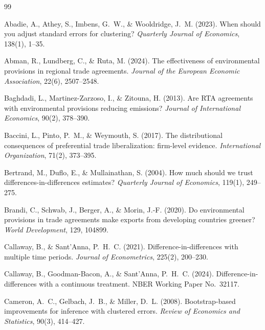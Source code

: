 \documentclass[12pt]{article}
\begin{document}
\begin{thebibliography}{99}

Abadie, A., Athey, S., Imbens, G.~W., \& Wooldridge, J.~M. (2023).
When should you adjust standard errors for clustering?
\emph{Quarterly Journal of Economics}, 138(1), 1--35.

Abman, R., Lundberg, C., \& Ruta, M. (2024).
The effectiveness of environmental provisions in regional trade agreements.
\emph{Journal of the European Economic Association}, 22(6), 2507--2548.

Baghdadi, L., Martinez-Zarzoso, I., \& Zitouna, H. (2013).
Are RTA agreements with environmental provisions reducing emissions?
\emph{Journal of International Economics}, 90(2), 378--390.

Baccini, L., Pinto, P.~M., \& Weymouth, S. (2017).
The distributional consequences of preferential trade liberalization: firm-level evidence.
\emph{International Organization}, 71(2), 373--395.

Bertrand, M., Duflo, E., \& Mullainathan, S. (2004).
How much should we trust differences-in-differences estimates?
\emph{Quarterly Journal of Economics}, 119(1), 249--275.

Brandi, C., Schwab, J., Berger, A., \& Morin, J.-F. (2020).
Do environmental provisions in trade agreements make exports from developing countries greener?
\emph{World Development}, 129, 104899.

Callaway, B., \& Sant'Anna, P.~H.~C. (2021).
Difference-in-differences with multiple time periods.
\emph{Journal of Econometrics}, 225(2), 200--230.

Callaway, B., Goodman-Bacon, A., \& Sant'Anna, P.~H.~C. (2024).
Difference-in-differences with a continuous treatment.
NBER Working Paper No.\ 32117.

Cameron, A.~C., Gelbach, J.~B., \& Miller, D.~L. (2008).
Bootstrap-based improvements for inference with clustered errors.
\emph{Review of Economics and Statistics}, 90(3), 414--427.


\end{thebibliography}
\end{document}
